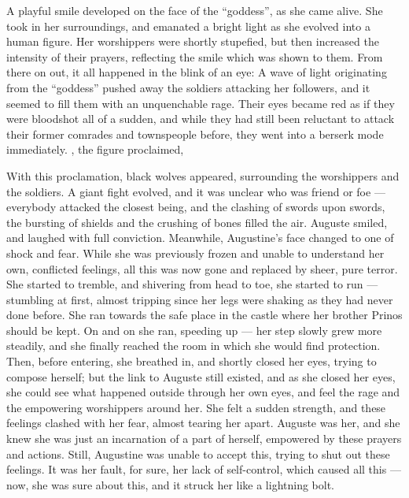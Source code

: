 A playful smile developed on the face of the \enquote{goddess}, as she came alive. She took in her surroundings, and emanated a bright light as she evolved into a human figure. Her worshippers were shortly stupefied, but then increased the intensity of their prayers, reflecting the smile which was shown to them. From there on out, it all happened in the blink of an eye: A wave of light originating from the \enquote{goddess} pushed away the soldiers attacking her followers, and it seemed to fill them with an unquenchable rage. Their eyes became red as if they were bloodshot all of a sudden, and while they had still been reluctant to attack their former comrades and townspeople before, they went into a berserk mode immediately. , the figure proclaimed, 

With this proclamation, black wolves appeared, surrounding the worshippers and the soldiers. A giant fight evolved, and it was unclear who was friend or foe --- everybody attacked the closest being, and the clashing of swords upon swords, the bursting of shields and the crushing of bones filled the air. Auguste smiled, and laughed with full conviction. Meanwhile, Augustine's face changed to one of shock and fear. While she was previously frozen and unable to understand her own, conflicted feelings, all this was now gone and replaced by sheer, pure terror. She started to tremble, and shivering from head to toe, she started to run --- stumbling at first, almost tripping since her legs were shaking as they had never done before. She ran towards the safe place in the castle where her brother Prinos should be kept. On and on she ran, speeding up --- her step slowly grew more steadily, and she finally reached the room in which she would find protection. Then, before entering, she breathed in, and shortly closed her eyes, trying to compose herself; but the link to Auguste still existed, and as she closed her eyes, she could see what happened outside through her own eyes, and feel the rage and the empowering worshippers around her. She felt a sudden strength, and these feelings clashed with her fear, almost tearing her apart. Auguste was her, and she knew she was just an incarnation of a part of herself, empowered by these prayers and actions. Still, Augustine was unable to accept this, trying to shut out these feelings. It was her fault, for sure, her lack of self-control, which caused all this --- now, she was sure about this, and it struck her like a lightning bolt.

